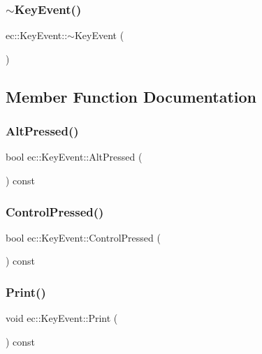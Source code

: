\subsubsection{\texorpdfstring{$\sim$\+Key\+Event()}{~KeyEvent()}}
{\footnotesize\ttfamily ec\+::\+Key\+Event\+::$\sim$\+Key\+Event (\begin{DoxyParamCaption}{ }\end{DoxyParamCaption})}



\subsection{Member Function Documentation}
\mbox{\label{structec_1_1_key_event_a6881e3dfbb485fdaed76e78663c7a106}} 
\subsubsection{\texorpdfstring{Alt\+Pressed()}{AltPressed()}}
{\footnotesize\ttfamily bool ec\+::\+Key\+Event\+::\+Alt\+Pressed (\begin{DoxyParamCaption}{ }\end{DoxyParamCaption}) const}

\mbox{\label{structec_1_1_key_event_af80f845419fb29c9b47a13cd7354bc27}} 
\subsubsection{\texorpdfstring{Control\+Pressed()}{ControlPressed()}}
{\footnotesize\ttfamily bool ec\+::\+Key\+Event\+::\+Control\+Pressed (\begin{DoxyParamCaption}{ }\end{DoxyParamCaption}) const}

\mbox{\label{structec_1_1_key_event_ae57433e16a6e51ca2fe57a41de0cf370}} 
\subsubsection{\texorpdfstring{Print()}{Print()}}
{\footnotesize\ttfamily void ec\+::\+Key\+Event\+::\+Print (\begin{DoxyParamCaption}{ }\end{DoxyParamCaption}) const}

